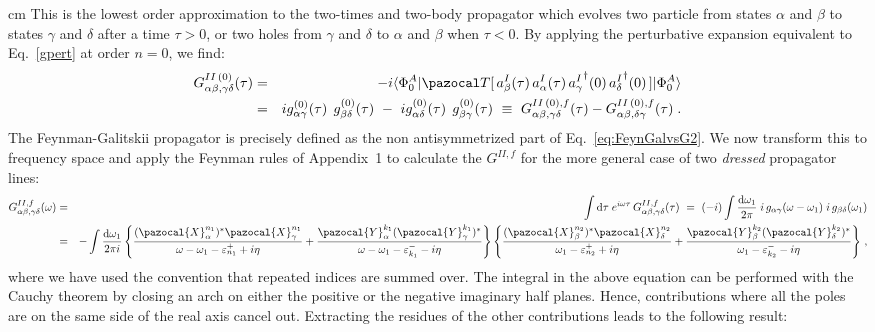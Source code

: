  cm
This is the lowest order approximation to the two-times and two-body propagator
which evolves two particle from states $\alpha$ and $\beta$ to  states  $\gamma$ and  $\delta$ after a time $\tau >0$, or two holes  from $\gamma$ and  $\delta$ to $\alpha$ and $\beta$ when $\tau < 0$.  By applying the perturbative expansion equivalent to Eq.~\eqref{gpert} at order $n=0$, we find:
\begin{eqnarray}
 G^{II\, (0)}_{\alpha \beta, \gamma \delta}(\tau) &=& -i \langle\Phi_0^A\vert {\pazocal T} [
       \, a^I_\beta(\tau)  \, a^I_\alpha(\tau) \, {a_{\gamma}^I}^\dag(0) \, {a_{\delta}^I}^\dag(0) \, ]  \vert\Phi_0^A\rangle
\nonumber \\
 &=& i g^{(0)}_{\alpha\gamma}(\tau) \; \, g^{(0)}_{\beta\delta}(\tau)  ~-~ i  g^{(0)}_{\alpha\delta}(\tau) \; \, g^{(0)}_{\beta\gamma}(\tau)
 ~ \equiv ~  G^{II\, (0),f}_{\alpha \beta, \gamma \delta}(\tau)   - G^{II\, (0),f}_{\alpha \beta, \delta\gamma}(\tau) \; .
\label{eq:FeynGalvsG2}
\end{eqnarray}
The Feynman-Galitskii propagator is precisely defined as the non antisymmetrized part of Eq.~\eqref{eq:FeynGalvsG2}.  We  now transform this to frequency space and apply the Feynman rules of Appendix~1 %
to calculate the  $G^{II,f}$ for the more general case of two {\em dressed} propagator lines:
\begin{eqnarray}
G^{II,f}_{\alpha \beta, \gamma \delta}(\omega) &=& \int {\rm d}\tau \; e^{i\omega \tau} \, G^{II,f}_{\alpha \beta, \gamma \delta}(\tau)
~=~ (-i) \int \frac {{\rm d} \omega_1}{2\pi} 
  \; i \,  g_{\alpha\gamma}(\omega-\omega_1) \; i \, g_{\beta\delta}(\omega_1)
\label{eq:GIIf_int} \\ \nonumber
&=& - \int \frac {{\rm d}  \omega_1}{2\pi i}  
  \left\{ \frac{(\pazocal{X}^{n_1}_\alpha)^*  \pazocal{X}^{n_1}_\gamma}{\omega - \omega_1  - \varepsilon^+_{n_1} + i\eta} 
        + \frac{\pazocal{Y}^{k_1}_\alpha  (\pazocal{Y}^{k_1}_\gamma)^*}{\omega - \omega_1  - \varepsilon^-_{k_1} - i\eta}  \right\}
          \left\{ \frac{(\pazocal{X}^{n_2}_\beta)^*  \pazocal{X}^{n_2}_\delta}{\omega_1  - \varepsilon^+_{n_2} + i\eta} 
        + \frac{\pazocal{Y}^{k_2}_\beta  (\pazocal{Y}^{k_2}_\delta)^*}{\omega_1  - \varepsilon^-_{k_2} - i\eta}  \right\} \, ,
\end{eqnarray}
where we have  used the convention that repeated indices are summed over. The integral in the above equation can be performed with the Cauchy theorem by closing an arch on either the positive or the negative imaginary half planes. Hence, contributions where all the poles are  on the same side of the real axis cancel out. Extracting the residues of the other contributions leads to the following result:
